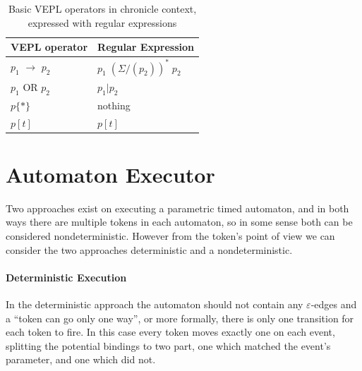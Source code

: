 \begin{table}
	\caption{Basic VEPL operators in chronicle context, expressed with regular expressions}		
	\label{tab:cep:vepl_regex_chronicle}
	\centering
	\begin{tabular}{@{}ll@{}}
		\toprule
		VEPL operator             & Regular Expression               \\ \midrule
		$p_1$ $\rightarrow$ $p_2$ & $p_1 \; (\Sigma/(p_2))^* \; p_2$ \\
		$p_1$ OR $p_2$            & $p_1|p_2$                        \\
		$p\{\ast\}$               & nothing                          \\
		$p[t]$                    & $p[t]$                           \\ \bottomrule
	\end{tabular}
\end{table}

\section{Automaton Executor}
	Two approaches exist on executing a parametric timed automaton, and in both ways there are multiple tokens in each automaton, so in some sense both can be considered nondeterministic.
	However from the token's point of view we can consider the two approaches deterministic and a nondeterministic.
	
	
	\paragraph{Deterministic Execution}
	In the deterministic approach the automaton should not contain any $\varepsilon$-edges and a ``token can go only one way'', or more formally, there is only one transition for each token to fire. 
	In this case every token moves exactly one on each event, splitting the potential bindings to two part, one which matched the event's parameter, and one which did not.
	
